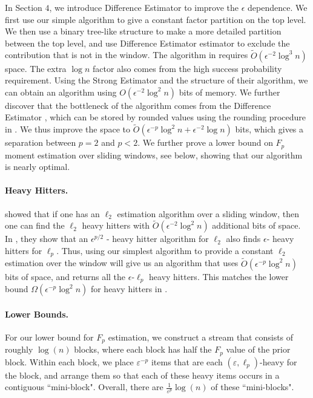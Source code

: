 \documentclass{article}
\newcommand{\est}{\textsf{Strong Estimator }}
\newcommand{\dif}{\textsf{Difference Estimator }}
\newcommand{\eps}{\varepsilon}
\theoremstyle{plain}
\begin{document}
In Section $4$, we introduce \dif \cite{woodruff2022tight} to improve the $\epsilon$ dependence. We first use our simple algorithm to give a constant factor partition on the top level. We then use a binary tree-like structure to make a more detailed partition between the top level, and use \dif estimator to exclude the contribution that is not in the window. The algorithm in \cite{woodruff2022tight} requires $\tilde{O}(\epsilon ^ {-2} \log ^ 3n)$ space. The extra $\log n$ factor also comes from the high success probability requirement. Using the \est and the structure of their algorithm, we can obtain an algorithm using $O(\epsilon ^ {-2} \log ^ 2n)$ bits of memory. We further discover that the bottleneck of the algorithm comes from the \dif, which can be stored by rounded values using the rounding procedure in \cite{rounding}. We thus improve the space to $\tilde{O}(\epsilon ^ {-p} \log ^ 2n + \epsilon ^ {-2} \log n)$ bits, which gives a separation between $p = 2$ and $p < 2$. We further prove a lower bound on $F_p$ moment estimation over sliding windows, see below, showing that our algorithm is nearly optimal.

\paragraph{Heavy Hitters.}
\cite{braverman2018nearly} showed that if one has an $\ell_2$ estimation algorithm over a sliding window, then one can find the $\ell_2$ heavy hitters with $\tilde{O}(\epsilon ^ {-2} \log ^ 2n)$ additional bits of space. In \cite{heavyhitter}, they show that an $\epsilon ^ {p/2}$ - heavy hitter algorithm for $\ell_2$ also finds $\epsilon$- heavy hitters for $\ell_p$. Thus, using our simplest algorithm to provide a constant $\ell_2$ estimation over the window will give us an algorithm that uses $\tilde{O}(\epsilon ^ {-p} \log ^ 2n)$ bits of space, and returns all the $\epsilon$-$\ell_p$ heavy hitters. This matches the lower bound $\Omega(\epsilon ^ {-p}\log ^ 2n)$ for heavy hitters in \cite{braverman2018nearly}.


\paragraph{Lower Bounds.}
For our lower bound for $F_p$ estimation, we construct a stream that consists of roughly $\log(n)$ blocks, where each block has half the $F_p$ value of the prior block.  Within each block, we place $\eps^{-p}$ items that are each $(\eps, \ell_p)$-heavy for the block, and arrange them so that each of these heavy items occurs in a contiguous ``mini-block".  Overall, there are $\frac{1}{\eps^p} \log(n)$ of these ``mini-blocks".
\end{document}
